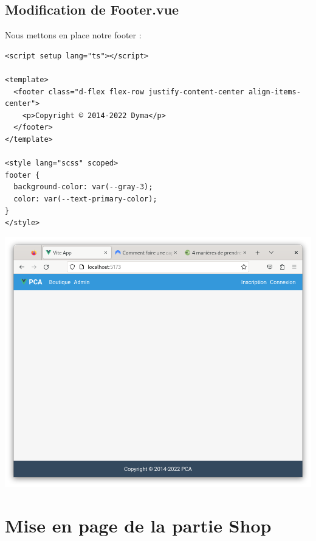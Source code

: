 \subsection{Modification de Footer.vue}
Nous mettons en place notre footer :
\begin{verbatim}
<script setup lang="ts"></script>

<template>
  <footer class="d-flex flex-row justify-content-center align-items-center">
    <p>Copyright © 2014-2022 Dyma</p>
  </footer>
</template>

<style lang="scss" scoped>
footer {
  background-color: var(--gray-3);
  color: var(--text-primary-color);
}
</style>
\end{verbatim}
\begin{center}
\includegraphics[width=15cm]{images/image17.png}
\end{center}


\section{Mise en page de la partie Shop}
